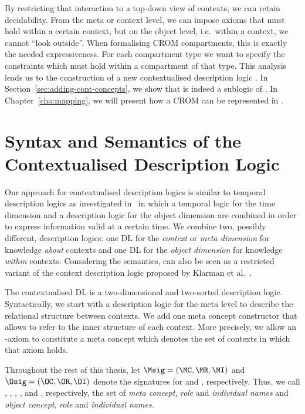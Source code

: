 By restricting that interaction to a top-down view of contexts, we can retain decidability. From the
meta or context level, we can impose axioms that must hold within a certain context, but on the object
level, i.e.\ within a context, we cannot \enquote{look outside}.
%
When formalising CROM compartments, this is exactly the needed expressiveness. For each compartment type
we want to specify the constraints which must hold within a compartment of that type.
%
This analysis leads us to the construction of a new contextualised description logic \LMLO.
In Section~\ref{sec:adding-cont-concepts}, we show that \ALCALC is indeed a sublogic of \klarALC.
In Chapter~\ref{cha:mapping}, we will present how a CROM can be represented in \LMLO.

\section{Syntax and Semantics of the Contextualised Description Logic \texorpdfstring{\LMLO}{LM⟦LO⟧}}
\label{sec:syn-seman-cdl}

Our approach for contextualised description logics is similar to temporal description logics as
investigated in~\cite{LuWZ-TIME08} in which a temporal logic for the time dimension and a
description logic for the object dimension are combined in order to express information valid at a
certain time. We combine two, possibly different, description logics: one DL \LM for the
\emph{context} or \emph{meta dimension} for knowledge \emph{about} contexts and one DL \LO for the
\emph{object dimension} for knowledge \emph{within} contexts.
%
Considering the semantics, \LMLO can also be seen as a restricted variant of the context description
logic proposed by Klarman et al.~\cite{KG16}.

The contextualised DL \LMLO is a two-dimensional and two-sorted description logic. Syntactically, we
start with a description logic \LM for the meta level to describe the relational structure between
contexts. We add one meta concept constructor that allows to refer to the inner structure of each
context. More precisely, we allow an \LO-axiom to constitute a meta concept which denotes the set of
contexts in which that axiom holds.

Throughout the rest of this thesis, let $\Msig = (\MC, \MR, \MI)$ and $\Osig = (\OC, \OR, \OI)$
denote the signatures for \LM and \LO, respectively. Thus, we call \MC, \MR, \MI, \OC, \OR and \OI,
respectively, the set of \emph{meta concept}, \emph{role} and \emph{individual names} and
\emph{object concept}, \emph{role} and \emph{individual names}.

